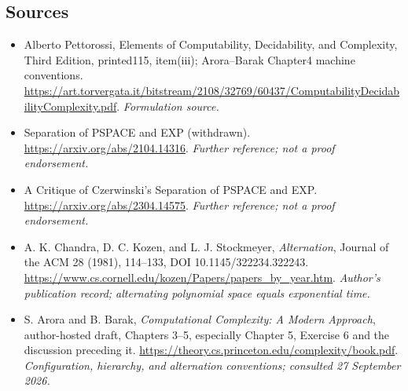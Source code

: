 \documentclass[11pt]{article}
\begin{document}
\subsection{Sources}
\begin{itemize}
\item[S1]Alberto Pettorossi, Elements of Computability, Decidability, and Complexity, Third Edition, printed115, item(iii); Arora–Barak Chapter4 machine conventions.
\url{https://art.torvergata.it/bitstream/2108/32769/60437/ComputabilityDecidabilityComplexity.pdf}.
\textit{Formulation source.}
\item[S2]Separation of PSPACE and EXP (withdrawn).
\url{https://arxiv.org/abs/2104.14316}.
\textit{Further reference; not a proof endorsement.}
\item[S3]A Critique of Czerwinski's Separation of PSPACE and EXP.
\url{https://arxiv.org/abs/2304.14575}.
\textit{Further reference; not a proof endorsement.}
\item[E1]A. K. Chandra, D. C. Kozen, and L. J. Stockmeyer, \emph{Alternation}, Journal of the ACM 28 (1981), 114--133, DOI 10.1145/322234.322243.
\url{https://www.cs.cornell.edu/kozen/Papers/papers_by_year.htm}.
\textit{Author's publication record; alternating polynomial space equals exponential time.}
\item[E2]S. Arora and B. Barak, \emph{Computational Complexity: A Modern Approach}, author-hosted draft, Chapters 3--5, especially Chapter 5, Exercise 6 and the discussion preceding it.
\url{https://theory.cs.princeton.edu/complexity/book.pdf}.
\textit{Configuration, hierarchy, and alternation conventions; consulted 27 September 2026.}
\end{itemize}
\end{document}
